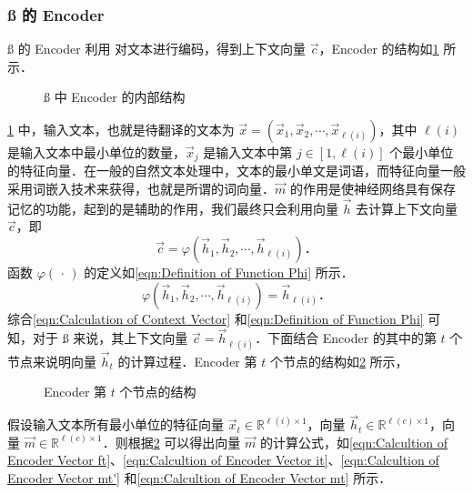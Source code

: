 \subsubsection{\ss{} 的 Encoder}
\indent\ss{} 的 Encoder 利用 \lstm{} 对文本进行编码，得到上下文向量 $\vec{c}$，Encoder 的结构如\cref{fig:Inner Structure of Encoder} 所示．%
%
\begin{figure}[!htb]
  \centering
  \scalebox{0.6}{}
  \caption{\ss{} 中 Encoder 的内部结构}
  \label{fig:Inner Structure of Encoder}
\end{figure}%
%
\cref{fig:Inner Structure of Encoder} 中，输入文本，也就是待翻译的文本为 $\vec{x} = (\vec{x}_1, \vec{x}_2, \cdots, \vec{x}_{\ell(i)})$，其中 $\ell(i)$ 是输入文本中最小单位的数量，$\vec{x}_j$ 是输入文本中第 $j\in[1, \ell(i)]$ 个最小单位的特征向量．在一般的自然文本处理中，文本的最小单文是词语，而特征向量一般采用词嵌入技术来获得，也就是所谓的词向量．$\vec{m}$ 的作用是使神经网络具有保存记忆的功能，起到的是辅助的作用，我们最终只会利用向量 $\vec{h}$ 去计算上下文向量 $\vec{c}$，即%
%
\begin{equation}\label{eqn:Calculation of Context Vector}
  \vec{c} = \varphi(\vec{h}_1, \vec{h}_2, \cdots, \vec{h}_{\ell(i)})\text{．}
\end{equation}%
%
函数 $\varphi(\,\cdot\,)$ 的定义如\cref{eqn:Definition of Function Phi} 所示．%
%
\begin{equation}\label{eqn:Definition of Function Phi}
  \varphi(\vec{h}_1, \vec{h}_2, \cdots, \vec{h}_{\ell(i)}) = \vec{h}_{\ell(i)}\text{．}
\end{equation}%
%
综合\cref{eqn:Calculation of Context Vector} 和\cref{eqn:Definition of Function Phi} 可知，对于 \ss{} 来说，其上下文向量 $\vec{c} = \vec{h}_{\ell(i)}$．下面结合 Encoder 的其中的第 $t$ 个节点来说明向量 $\vec{h}_t$ 的计算过程．Encoder 第 $t$ 个节点的结构如\cref{fig:Inner Structure of Encoder Node} 所示，%
%
\begin{figure}[!htb]
  \centering
  \scalebox{0.7}{}
  \caption{Encoder 第 $t$ 个节点的结构}
  \label{fig:Inner Structure of Encoder Node}
\end{figure}%
%
假设输入文本所有最小单位的特征向量 $\vec{x}_t\in\mathbb{R}^{\ell(i)\times 1}$，向量 $\vec{h}_t\in\mathbb{R}^{\ell(c)\times 1}$，向量 $\vec{m}\in\mathbb{R}^{\ell(c)\times 1}$．则根据\cref{fig:Inner Structure of Encoder Node} 可以得出向量 $\vec{m}$ 的计算公式，如\cref{eqn:Calcultion of Encoder Vector ft}、\cref{eqn:Calcultion of Encoder Vector it}、\cref{eqn:Calcultion of Encoder Vector mt'} 和\cref{eqn:Calcultion of Encoder Vector mt} 所示．%
